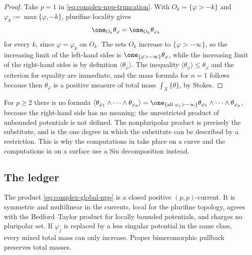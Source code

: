 \begin{proof}
Take \(p=1\) in \eqref{eq:complex-npp-truncation}.  With
\(O_k=\{\varphi>-k\}\) and \(\varphi_k:=\max\{\varphi,-k\}\), plurifine
locality gives
\[
 \one_{O_k}\theta_\varphi=\one_{O_k}\theta_{\varphi_k}
\]
for every \(k\), since \(\varphi=\varphi_k\) on \(O_k\).  The sets
\(O_k\) increase to \(\{\varphi>-\infty\}\), so the increasing limit of
the left-hand sides is \(\one_{\{\varphi>-\infty\}}\theta_\varphi\), while
the increasing limit of the right-hand sides is by definition
\(\langle\theta_\varphi\rangle\).  The inequality
\(\langle\theta_\varphi\rangle\leq\theta_\varphi\) and the criterion for
equality are immediate, and the mass formula for \(n=1\) follows because
then \(\theta_\varphi\) is a positive measure of total mass
\(\int_X\{\theta\}\), by Stokes.
\end{proof}

\begin{remark}
\label{rem:ch51-npp-no-restriction}
For \(p\geq2\) there is no formula
\(\langle\theta_{\varphi_1}\wedge\cdots\wedge\theta_{\varphi_p}\rangle
=\one_{\{\text{all }\varphi_j>-\infty\}}
\theta_{\varphi_1}\wedge\cdots\wedge\theta_{\varphi_p}\), because the
right-hand side has no meaning: the unrestricted product of unbounded
potentials is not defined.  The nonpluripolar product is precisely the
substitute, and  is the one degree in
which the substitute can be described by a restriction.  This is why the
computations in  take place on a curve and the
computations in  on a surface use a Siu
decomposition instead.
\end{remark}

\subsection{The ledger}
\label{sec:ch51-npp-ledger}

\begin{theorem}\label{thm:complex-npp-ledger}
The product \eqref{eq:complex-global-npp} is a closed positive
\((p,p)\)-current.  It is symmetric and multilinear in the currents,
local for the plurifine topology, agrees with the Bedford--Taylor
product for locally bounded potentials, and charges no pluripolar set.
If \(\varphi_j\) is replaced by a less singular potential in the same
class, every mixed total mass can only increase.  Proper bimeromorphic
pullback preserves total masses.
\end{theorem}

